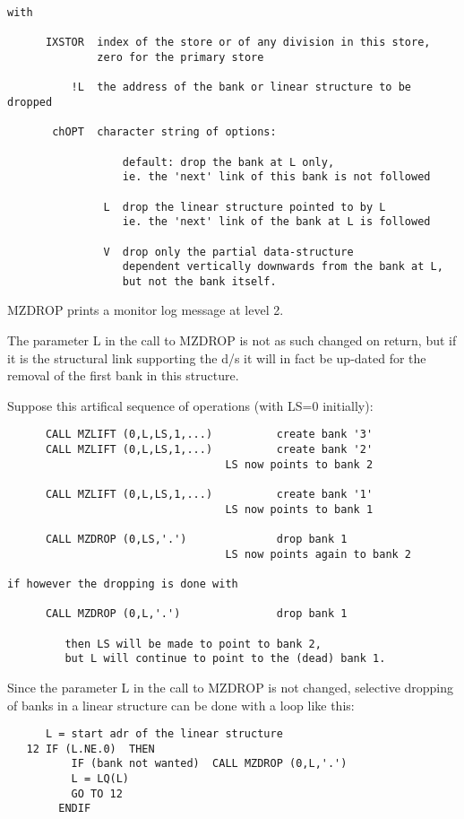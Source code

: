 \begin{verbatim}
with

      IXSTOR  index of the store or of any division in this store,
              zero for the primary store

          !L  the address of the bank or linear structure to be dropped

       chOPT  character string of options:

                  default: drop the bank at L only,
                  ie. the 'next' link of this bank is not followed

               L  drop the linear structure pointed to by L
                  ie. the 'next' link of the bank at L is followed

               V  drop only the partial data-structure
                  dependent vertically downwards from the bank at L,
                  but not the bank itself.
\end{verbatim} 
MZDROP prints a monitor log message at level 2.

The parameter L in the call to MZDROP is not as such changed
on return,
but if it is the structural link supporting the d/s it will
in fact be up-dated for the removal of the first bank
in this structure.

Suppose this artifical sequence of operations (with LS=0 initially):
\begin{verbatim}
      CALL MZLIFT (0,L,LS,1,...)          create bank '3'
      CALL MZLIFT (0,L,LS,1,...)          create bank '2'
                                  LS now points to bank 2

      CALL MZLIFT (0,L,LS,1,...)          create bank '1'
                                  LS now points to bank 1

      CALL MZDROP (0,LS,'.')              drop bank 1
                                  LS now points again to bank 2

if however the dropping is done with

      CALL MZDROP (0,L,'.')               drop bank 1

         then LS will be made to point to bank 2,
         but L will continue to point to the (dead) bank 1.
\end{verbatim}
Since the parameter L in the call to MZDROP is not changed,
selective dropping of banks in a linear structure can be done
with a loop like this:
\begin{verbatim}
      L = start adr of the linear structure
   12 IF (L.NE.0)  THEN
          IF (bank not wanted)  CALL MZDROP (0,L,'.')
          L = LQ(L)
          GO TO 12
        ENDIF
\end{verbatim}

